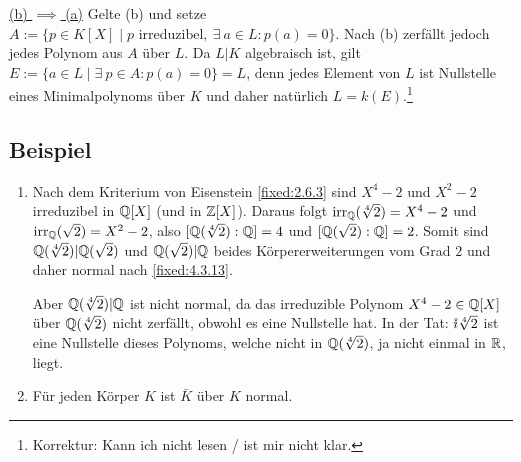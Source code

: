 \underline{(b) $\implies$ (a)} Gelte (b) und setze $A := \{p \in K[X] \mid p \text{ irreduzibel},~\exists~a \in L : p(a) = 0\}$. Nach (b) zerfällt jedoch jedes Polynom aus $A$ über $L$. Da $L|K$ algebraisch ist, gilt $E := \{a \in L \mid \exists~p \in A : p(a)=0\} =L$, denn jedes Element von $L$ ist Nullstelle eines Minimalpolynoms über $K$ und daher natürlich $L = k(E)$.\footnote{Korrektur: Kann ich nicht lesen / ist mir nicht klar.}

\subsection{Beispiel}
\begin{enumerate}[label=(\alph*)]
	\item
		Nach dem Kriterium von Eisenstein \ref{fixed:2.6.3} sind $X^4-2$ und $X^2-2$ irreduzibel in $\mathbb Q[X]$ (und in $\mathbb Z[X]$). Daraus folgt $\operatorname{irr}_\mathbb Q(\sqrt[4]{2}) = X^4-2$ und $\operatorname{irr}_\mathbb Q(\sqrt 2) = X^2-2$, also $[\mathbb Q(\sqrt[4]{2}) : \mathbb Q] = 4$ und $[\mathbb Q(\sqrt 2) : \mathbb Q] = 2$. Somit sind $\mathbb Q(\sqrt[4]{2})|\mathbb Q(\sqrt 2)$ und $\mathbb Q(\sqrt2)|\mathbb Q$ beides Körpererweiterungen vom Grad $2$ und daher normal nach \ref{fixed:4.3.13}.
		
		Aber $\mathbb Q(\sqrt[4]{2})|\mathbb Q$ ist nicht normal, da das irreduzible Polynom $X^4-2 \in \mathbb Q[X]$ über $\mathbb Q(\sqrt[4]{2})$ nicht zerfällt, obwohl es eine Nullstelle hat. In der Tat: $\mathring\imath\sqrt[4]{2}$ ist eine Nullstelle dieses Polynoms, welche nicht in $\mathbb Q(\sqrt[4]{2})$, ja nicht einmal in $\mathbb R$, liegt.
		
	\item
		Für jeden Körper $K$ ist $\bar K$ über $K$ normal.
\end{enumerate}